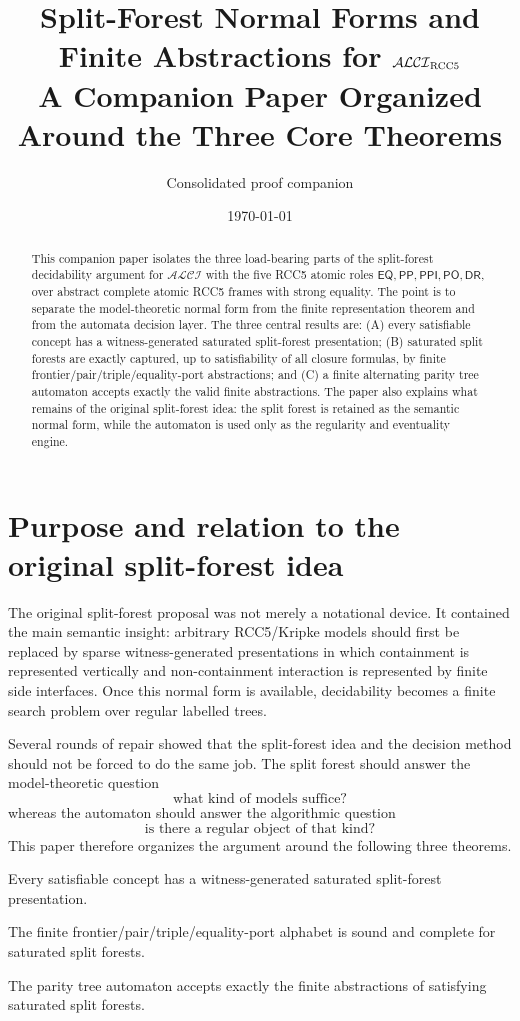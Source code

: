 \documentclass[11pt]{article}
\title{Split-Forest Normal Forms and Finite Abstractions for $\ALCI_{\RCC}$\\
\large A Companion Paper Organized Around the Three Core Theorems}
\author{Consolidated proof companion}
\date{\today}
\newcommand{\ALCI}{\mathcal{ALCI}}
\newcommand{\EQ}{\mathsf{EQ}}
\newcommand{\PP}{\mathsf{PP}}
\newcommand{\PPI}{\mathsf{PPI}}
\newcommand{\PO}{\mathsf{PO}}
\newcommand{\DR}{\mathsf{DR}}
\begin{document}
\maketitle

\begin{abstract}
This companion paper isolates the three load-bearing parts of the split-forest decidability argument for $\ALCI$ with the five RCC5 atomic roles $\EQ,\PP,\PPI,\PO,\DR$, over abstract complete atomic RCC5 frames with strong equality.  The point is to separate the model-theoretic normal form from the finite representation theorem and from the automata decision layer.  The three central results are: (A) every satisfiable concept has a witness-generated saturated split-forest presentation; (B) saturated split forests are exactly captured, up to satisfiability of all closure formulas, by finite frontier/pair/triple/equality-port abstractions; and (C) a finite alternating parity tree automaton accepts exactly the valid finite abstractions.  The paper also explains what remains of the original split-forest idea: the split forest is retained as the semantic normal form, while the automaton is used only as the regularity and eventuality engine.
\end{abstract}

\tableofcontents

\section{Purpose and relation to the original split-forest idea}

The original split-forest proposal was not merely a notational device.  It contained the main semantic insight: arbitrary RCC5/Kripke models should first be replaced by sparse witness-generated presentations in which containment is represented vertically and non-containment interaction is represented by finite side interfaces.  Once this normal form is available, decidability becomes a finite search problem over regular labelled trees.

Several rounds of repair showed that the split-forest idea and the decision method should not be forced to do the same job.  The split forest should answer the model-theoretic question
\[
  \text{what kind of models suffice?}
\]
whereas the automaton should answer the algorithmic question
\[
  \text{is there a regular object of that kind?}
\]
This paper therefore organizes the argument around the following three theorems.

\begin{description}[leftmargin=2.8cm,style=nextline]
\item[Theorem A.] Every satisfiable concept has a witness-generated saturated split-forest presentation.
\item[Theorem B.] The finite frontier/pair/triple/equality-port alphabet is sound and complete for saturated split forests.
\item[Theorem C.] The parity tree automaton accepts exactly the finite abstractions of satisfying saturated split forests.
\end{description}
\end{document}
